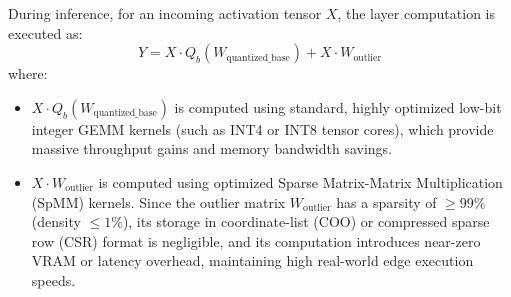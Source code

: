 During inference, for an incoming activation tensor $X$, the layer computation is executed as:
\begin{equation}
Y = X \cdot Q_b(W_{\text{quantized\_base}}) + X \cdot W_{\text{outlier}}
\end{equation}
where:
\begin{itemize}
    \item $X \cdot Q_b(W_{\text{quantized\_base}})$ is computed using standard, highly optimized low-bit integer GEMM kernels (such as INT4 or INT8 tensor cores), which provide massive throughput gains and memory bandwidth savings.
    \item $X \cdot W_{\text{outlier}}$ is computed using optimized Sparse Matrix-Matrix Multiplication (SpMM) kernels. Since the outlier matrix $W_{\text{outlier}}$ has a sparsity of $\ge 99\%$ (density $\le 1\%$), its storage in coordinate-list (COO) or compressed sparse row (CSR) format is negligible, and its computation introduces near-zero VRAM or latency overhead, maintaining high real-world edge execution speeds.
\end{itemize}
